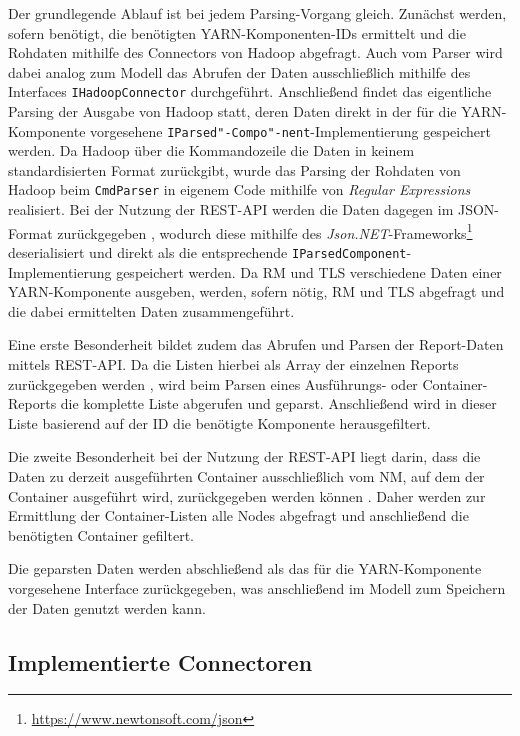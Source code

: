 Der grundlegende Ablauf ist bei jedem Parsing-Vorgang gleich. Zunächst werden, sofern benötigt, die benötigten YARN-Komponenten-IDs ermittelt und die Rohdaten mithilfe des Connectors von Hadoop abgefragt. Auch vom Parser wird dabei analog zum Modell das Abrufen der Daten ausschließlich mithilfe des Interfaces \texttt{IHadoopConnector} durchgeführt. Anschließend findet das eigentliche Parsing der Ausgabe von Hadoop statt, deren Daten direkt in der für die YARN-Komponente vorgesehene \texttt{IParsed"-Compo"-nent}-Implementierung gespeichert werden. Da Hadoop über die Kommandozeile die Daten in keinem standardisierten Format zurückgibt, wurde das Parsing der Rohdaten von Hadoop beim \texttt{CmdParser} in eigenem Code mithilfe von \emph{Regular Expressions} realisiert. Bei der Nutzung der REST-API werden die Daten dagegen im JSON-Format zurückgegeben \cite{HadoopYarnTlServer271,HadoopRmApi271,HadoopNmApi271}, wodurch diese mithilfe des \emph{Json.NET}-Frameworks\footnote{\url{https://www.newtonsoft.com/json}} deserialisiert und direkt als die entsprechende \texttt{IParsedComponent}-Implementierung gespeichert werden. Da \ac{RM} und \ac{TLS} verschiedene Daten einer YARN-Komponente ausgeben, werden, sofern nötig, \ac{RM} und \ac{TLS} abgefragt und die dabei ermittelten Daten zusammengeführt.

Eine erste Besonderheit bildet zudem das Abrufen und Parsen der Report-Daten mittels REST-API. Da die Listen hierbei als Array der einzelnen Reports zurückgegeben werden \cite{HadoopYarnTlServer271,HadoopRmApi271,HadoopNmApi271}, wird beim Parsen eines Ausführungs- oder Container-Reports die komplette Liste abgerufen und geparst. Anschließend wird in dieser Liste basierend auf der ID die benötigte Komponente herausgefiltert.

Die zweite Besonderheit bei der Nutzung der REST-API liegt darin, dass die Daten zu derzeit ausgeführten Container ausschließlich vom \ac{NM}, auf dem der Container ausgeführt wird, zurückgegeben werden können \cite{HadoopRmApi271,HadoopNmApi271}. Daher werden zur Ermittlung der Container-Listen alle Nodes abgefragt und anschließend die benötigten Container gefiltert.

Die geparsten Daten werden abschließend als das für die YARN-Komponente vorgesehene Interface zurückgegeben, was anschließend im Modell zum Speichern der Daten genutzt werden kann.

\subsection{Implementierte Connectoren}\label{sec:implementedConnectors}

